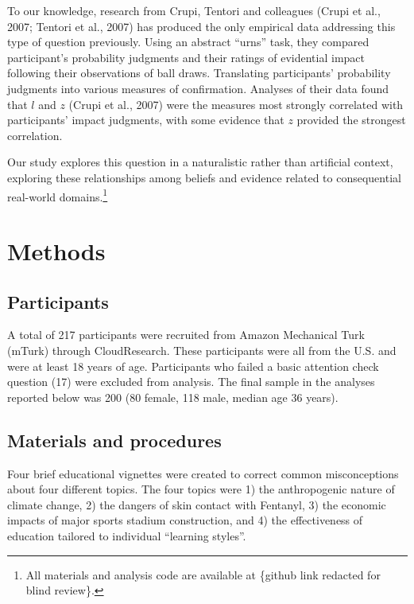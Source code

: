 \documentclass[10pt, letterpaper]{article}
\begin{document}
To our knowledge, research from Crupi, Tentori and colleagues (Crupi et
al., 2007; Tentori et al., 2007) has produced the only empirical data
addressing this type of question previously. Using an abstract ``urns''
task, they compared participant's probability judgments and their
ratings of evidential impact following their observations of ball draws.
Translating participants' probability judgments into various measures of
confirmation. Analyses of their data found that \(l\) and \(z\) (Crupi
et al., 2007) were the measures most strongly correlated with
participants' impact judgments, with some evidence that \(z\) provided
the strongest correlation.

Our study explores this question in a naturalistic rather than
artificial context, exploring these relationships among beliefs and
evidence related to consequential real-world domains.\footnote{All
  materials and analysis code are available at \{github link redacted
  for blind review\}.}

\hypertarget{methods}{%
\section{Methods}\label{methods}}

\hypertarget{participants}{%
\subsection{Participants}\label{participants}}

A total of 217 participants were recruited from Amazon Mechanical Turk
(mTurk) through CloudResearch. These participants were all from the U.S.
and were at least 18 years of age. Participants who failed a basic
attention check question (17) were excluded from analysis. The final
sample in the analyses reported below was 200 (80 female, 118 male,
median age 36 years).

\hypertarget{materials-and-procedures}{%
\subsection{Materials and procedures}\label{materials-and-procedures}}

Four brief educational vignettes were created to correct common
misconceptions about four different topics. The four topics were 1) the
anthropogenic nature of climate change, 2) the dangers of skin contact
with Fentanyl, 3) the economic impacts of major sports stadium
construction, and 4) the effectiveness of education tailored to
individual ``learning styles''.
\end{document}
